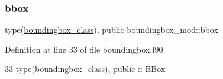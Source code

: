 \subsubsection{\texorpdfstring{bbox}{bbox}}
{\footnotesize\ttfamily type(\mbox{\hyperlink{structboundingbox__mod_1_1boundingbox__class}{boundingbox\+\_\+class}}), public boundingbox\+\_\+mod\+::bbox}



Definition at line 33 of file boundingbox.\+f90.


\begin{DoxyCode}
33   \textcolor{keywordtype}{type}(boundingbox\_class), \textcolor{keywordtype}{public} :: BBox
\end{DoxyCode}
